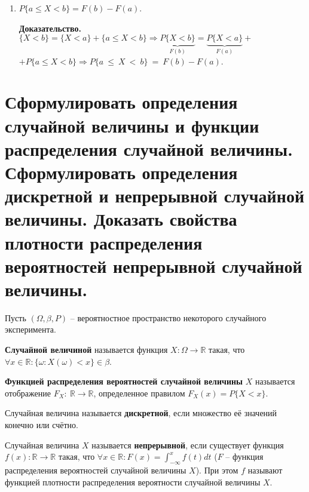 \begin{enumerate}
	\item $P\{a \leq X < b\} = F(b) - F(a)$.
	
		\textbf{Доказательство.} $\{X < b\} = \{X < a\} + \{a \leq X < b\} \Rightarrow \underbrace{P\{X < b\}}_\text{$F(b)$} = \underbrace{P\{X < a\}}_\text{$F(a)$} +$\newline $+P\{a \leq X < b\} \Rightarrow P\{a~\leq~X~<~b\}~=~F(b) - F(a)$.
\end{enumerate}

\section{Сформулировать определения случайной величины и функции распределения случайной величины. Сформулировать определения дискретной и непрерывной случайной величины. Доказать свойства плотности распределения вероятностей непрерывной случайной величины.}

Пусть $(\Omega, \beta, P)$ -- вероятностное пространство некоторого случайного эксперимента.

\textbf{Случайной величиной} называется функция $X: \Omega \rightarrow \mathbb{R}$ такая, что $\forall x \in \mathbb{R}: \{\omega: X(\omega) < x\} \in \beta$.

\textbf{Функцией распределения вероятностей случайной величины} $X$ называется отображение $F_X:~\mathbb{R}\rightarrow\mathbb{R}$, определенное правилом $F_X(x) = P\{X < x\}$.

Случайная величина называется \textbf{дискретной}, если множество её значений конечно или счётно.

Случайная величина $X$ называется \textbf{непрерывной}, если существует функция $f(x): \mathbb{R} \rightarrow \mathbb{R}$ такая, что $\forall x \in \mathbb{R}: F(x) = \int_{-\infty}^{x}f(t)dt$ ($F$ -- функция распределения вероятностей случайной величины $X$). При этом $f$ называют функцией плотности распределения вероятности случайной величины $X$.

